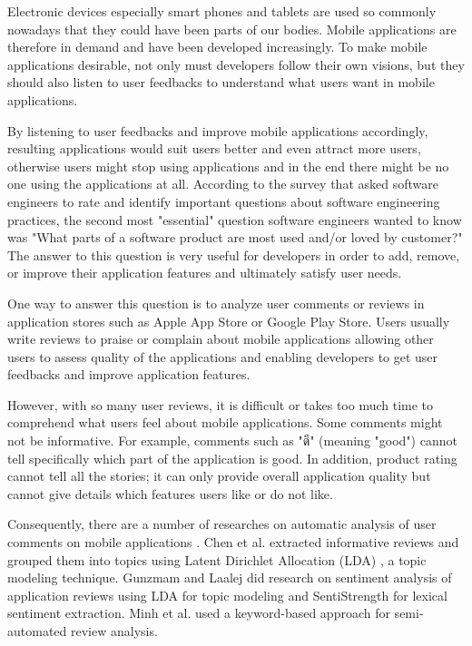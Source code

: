 
Electronic devices especially smart phones and tablets are used so commonly nowadays that they could have been parts of our bodies. Mobile applications are therefore in demand and have been developed increasingly. To make mobile applications desirable, not only must developers follow their own visions, but they should also listen to user feedbacks to understand what users want in mobile applications.

By listening to user feedbacks and improve mobile applications accordingly, resulting applications would suit users better and even attract more users, otherwise users might stop using applications and in the end there might be no one using the applications at all. According to the survey \cite{145Q} that asked software engineers to rate and identify important questions about software engineering practices, the second most "essential" question software engineers wanted to know was "What parts of a software product are most used and/or loved by customer?" The answer to this question is very useful for developers in order to add, remove, or improve their application features and ultimately satisfy user needs.

One way to answer this question is to analyze user comments or reviews in application stores such as Apple App Store or Google Play Store. Users usually write reviews to praise or complain about mobile applications allowing other users to assess quality of the applications and enabling developers to get user feedbacks and improve application features. 

However, with so many user reviews, it is difficult or takes too much time to comprehend what users feel about mobile applications. Some comments might not be informative. For example, comments such as "ดี" (meaning "good") cannot tell specifically which part of the application is good. In addition, product rating cannot tell all the stories; it can only provide overall application quality but cannot give details which features users like or do not like.

Consequently, there are a number of researches on automatic analysis of user comments on mobile applications \cite{ar-miner,userslikefeature,keywordmining}. Chen et al.\cite{ar-miner} extracted informative reviews and grouped them into topics using Latent Dirichlet Allocation (LDA) \cite{LDA}, a topic modeling technique. Gunzmam and Laalej \cite{userslikefeature} did research on sentiment analysis of application reviews using LDA \cite{LDA} for topic modeling and SentiStrength \cite{SentiStrength} for lexical sentiment extraction. Minh et al. \cite{keywordmining} used a keyword-based approach for semi-automated review analysis.

